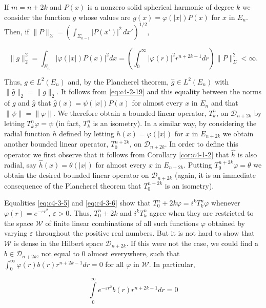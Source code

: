 If $m = n + 2k$ and $P(x)$ is a nonzero solid spherical harmonic of degree $k$ we consider the function $g$ whose values are $g(x) = \varphi(|x|)P(x)$ for $x$ in $E_n$. Then, if $\|P\|_{\Sigma} = (\int_{\Sigma_{n-1}}|P(x')|^2 \, dx')^{1/2}$,

\[
\|g\|_{2}^{2}=\int_{E_{n}}|\varphi(|x|)P(x)|^{2}d x=\left(\int_{0}^{\infty}|\varphi(r)|^{2}r^{n+2k-1}d r\right)\|P\|_{\Sigma}^{2}<\infty.
\]

Thus, $g \in L^{2}(E_{n})$ and, by the Plancherel theorem, $\hat{g} \in L^{2}(E_{n})$ with $\|\hat{g}\|_{2} = \|g\|_{2}$. It follows from \eqref{eq:c4-2-19} and this equality between the norms of $g$ and $\hat{g}$ that $\hat{g}(x) = \psi(|x|)P(x)$ for almost every $x$ in $E_{n}$ and that $\|\psi\| = \|\varphi\|$. We therefore obtain a bounded linear operator, $T_{k}^{n}$, on $\mathcal{D}_{n+2k}$ by letting $T_{k}^{n}\varphi = \psi$ (in fact, $T_{k}^{n}$ is an isometry). In a similar way, by considering the radial function $h$ defined by letting $h(x) = \varphi(|x|)$ for $x$ in $E_{n+2k}$ we obtain another bounded linear operator, $T_{0}^{n+2k}$, on $\mathcal{D}_{n+2k}$. In order to define this operator we first observe that it follows from Corollary \ref{cor:c4-1-2} that $\hat{h}$ is also radial, say $\hat{h}(x) = \theta(|x|)$ for almost every $x$ in $E_{n+2k}$. Putting $T_{0}^{n+2k}\varphi = \theta$ we obtain the desired bounded linear operator on $\mathcal{D}_{n+2k}$ (again, it is an immediate consequence of the Plancherel theorem that $T_{0}^{n+2k}$ is an isometry).

Equalities \eqref{eq:c4-3-5} and \eqref{eq:c4-3-6} show that $T_0^n + 2k\varphi = i^k T_k^n\varphi$ whenever $\varphi(r) = e^{-\varepsilon r^2}$, $\varepsilon > 0$. Thus, $T_0^n + 2k$ and $i^k T_k^n$ agree when they are restricted to the space $\mathcal{W}$ of finite linear combinations of all such functions $\varphi$ obtained by varying $\varepsilon$ throughout the positive real numbers. But it is not hard to show that $\mathcal{W}$ is dense in the Hilbert space $\mathcal{D}_{n+2k}$. If this were not the case, we could find a $b \in \mathcal{D}_{n+2k}$, not equal to 0 almost everywhere, such that $\int_0^\infty \varphi(r) b(r) r^{n+2k-1} dr = 0$ for all $\varphi$ in $\mathcal{W}$. In particular,

\begin{equation}\label{eq:c4-3-8}
\int\limits_{0}^{\infty}e^{-\varepsilon r^{2}}b(r)r^{n+2k-1}dr=0
\end{equation}

